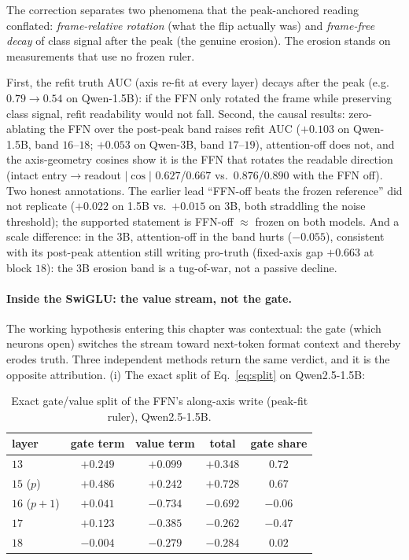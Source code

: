 \documentclass[11pt]{article}
\begin{document}
The correction separates two phenomena that the peak-anchored reading
conflated: \emph{frame-relative rotation} (what the flip actually was) and
\emph{frame-free decay} of class signal after the peak (the genuine
erosion). The erosion stands on measurements that use no frozen ruler.

First, the refit truth AUC (axis re-fit at every layer) decays after the
peak (e.g.\ $0.79 \to 0.54$ on Qwen-1.5B): if the FFN only rotated the frame
while preserving class signal, refit readability would not fall. Second, the
causal results: zero-ablating the FFN over the post-peak band raises refit
AUC ($+0.103$ on Qwen-1.5B, band $16$--$18$; $+0.053$ on Qwen-3B, band
$17$--$19$), attention-off does not, and the axis-geometry cosines show it
is the FFN that rotates the readable direction (intact entry$\to$readout
$|\cos|$ $0.627$/$0.667$ vs.\ $0.876$/$0.890$ with the FFN off). Two honest
annotations. The earlier lead ``FFN-off beats the frozen reference'' did not
replicate ($+0.022$ on 1.5B vs.\ $+0.015$ on 3B, both straddling the noise
threshold); the supported statement is FFN-off $\approx$ frozen on both
models. And a scale difference: in the 3B, attention-off in the band hurts
($-0.055$), consistent with its post-peak attention still writing pro-truth
(fixed-axis gap $+0.663$ at block $18$): the 3B erosion band is a
tug-of-war, not a passive decline.

\paragraph{Inside the SwiGLU: the value stream, not the gate.} The working
hypothesis entering this chapter was contextual: the gate (which neurons
open) switches the stream toward next-token format context and thereby
erodes truth. Three independent methods return the same verdict, and it is
the opposite attribution. (i) The exact split of Eq.~\ref{eq:split} on
Qwen2.5-1.5B:

\begin{table}[H]
\centering
\caption{Exact gate/value split of the FFN's along-axis write (peak-fit
ruler), Qwen2.5-1.5B.}
\label{tab:split}
\begin{tabular}{lcccc}
\toprule
layer & gate term & value term & total & gate share \\
\midrule
$13$          & $+0.249$ & $+0.099$ & $+0.348$ & $0.72$ \\
$15$ ($p$)    & $+0.486$ & $+0.242$ & $+0.728$ & $0.67$ \\
$16$ ($p{+}1$) & $+0.041$ & $-0.734$ & $-0.692$ & $-0.06$ \\
$17$          & $+0.123$ & $-0.385$ & $-0.262$ & $-0.47$ \\
$18$          & $-0.004$ & $-0.279$ & $-0.284$ & $0.02$ \\
\bottomrule
\end{tabular}
\end{table}
\end{document}
